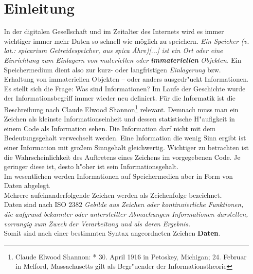 
\chapter{Einleitung}
\label{ch:Einleitung}

In der digitalen Gesellschaft und im Zeitalter des Internets wird es immer wichtiger immer mehr Daten so schnell wie möglich zu speichern.  \textit{Ein Speicher (v. lat.: spicarium Getreidespeicher, aus spica Ähre)[...] ist ein Ort oder eine Einrichtung zum Einlagern von materiellen oder} \textbf{\textit{immateriellen}} \textit{Objekten.} \cite{wiki:Speicher}
\newline
Ein Speichermedium dient also zur kurz- oder langfristigen \glqq \textit{Einlagerung}\grqq{} bzw. Erhaltung von immateriellen Objekten – oder anders ausgedr"uckt Informationen. 
Es stellt sich die Frage: Was sind Informationen? \newline
Im Laufe der Geschichte wurde der Informationsbegriff immer wieder neu definiert. Für die Informatik ist die Beschreibung nach Claude Elwood Shannon\footnote{Claude Elwood Shannon: * 30. April 1916 in Petoskey, Michigan; \textdagger{} 24. Februar in Melford, Massachusetts gilt als Begr"uender der Informationstheorie} relevant. Demnach muss man ein Zeichen als kleinste Informationseinheit und dessen statistische H"aufigkeit in einem Code als Information sehen. 
\newline
Die Information darf nicht mit dem Bedeutungsgehalt verwechselt werden. Eine Information die wenig Sinn ergibt ist einer Information mit großem Sinngehalt gleichwertig. Wichtiger zu betrachten ist die Wahrscheinlichkeit des Auftretens eines Zeichens im vorgegebenen Code. Je geringer diese ist, desto h"oher ist sein Informationsgehalt.
\\
Im wesentlichen werden Informationen auf Speichermedien aber in Form von Daten abgelegt. 
\\Mehrere aufeinanderfolgende Zeichen werden als Zeichenfolge bezeichnet.\cite{hansen:wi1}
\\ 
Daten sind nach ISO 2382 
\glqq \textit{Gebilde aus Zeichen oder kontinuierliche Funktionen, die aufgrund bekannter oder unterstellter Abmachungen Informationen darstellen, vorrangig zum Zweck der Verarbeitung und als deren Ergebnis.}\grqq{} 
\\
Somit sind nach einer bestimmten Syntax angeordneten Zeichen \textbf{Daten}.

